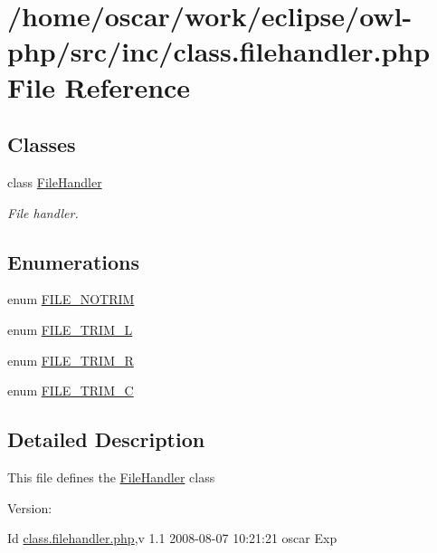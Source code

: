 \hypertarget{class_8filehandler_8php}{
\section{/home/oscar/work/eclipse/owl-php/src/inc/class.filehandler.php File Reference}
\label{class_8filehandler_8php}
}
\subsection*{Classes}
\begin{CompactItemize}
\item 
class \hyperlink{classFileHandler}{FileHandler}
\begin{CompactList}\small\item\em File handler. \item\end{CompactList}\end{CompactItemize}
\subsection*{Enumerations}
\begin{CompactItemize}
\item 
enum \hyperlink{class_8filehandler_8php_3720f2e15eb9e16e29d8ecbb96763662}{FILE\_\-NOTRIM} 
\item 
enum \hyperlink{class_8filehandler_8php_080de95fd7cf2e8d8ac78ac7ad9471ee}{FILE\_\-TRIM\_\-L} 
\item 
enum \hyperlink{class_8filehandler_8php_7ee25ec88036b90f5a0ae8be7bc41769}{FILE\_\-TRIM\_\-R} 
\item 
enum \hyperlink{class_8filehandler_8php_2787c3a1ecef8697c863800d0b2848a4}{FILE\_\-TRIM\_\-C} 
\end{CompactItemize}


\subsection{Detailed Description}
This file defines the \hyperlink{classFileHandler}{FileHandler} class \begin{Desc}
\item[Version:]\end{Desc}
\begin{Desc}
\item[Id]\hyperlink{class_8filehandler_8php}{class.filehandler.php},v 1.1 2008-08-07 10:21:21 oscar Exp \end{Desc}


